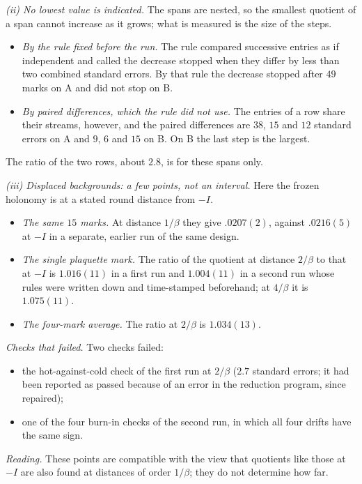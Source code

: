 \emph{{\upshape(ii)} No lowest value is indicated.} The spans are nested, so the smallest quotient of a span
cannot increase as it grows; what is measured is the size of the steps.
\begin{itemize}
\item \emph{By the rule fixed before the run.} The rule compared successive entries as if independent and
called the decrease stopped when they differ by less than two combined standard errors. By that rule the
decrease stopped after $49$ marks on \textsf{A} and did not stop on \textsf{B}.
\item \emph{By paired differences, which the rule did not use.} The entries of a row share their streams,
however, and the paired differences are $38$, $15$ and $12$ standard errors on \textsf{A} and $9$, $6$ and $15$ on \textsf{B}.
On \textsf{B} the last step is the largest.
\end{itemize}
The ratio of the two rows, about $2.8$, is for these spans only.

\emph{{\upshape(iii)} Displaced backgrounds: a few points, not an interval.} Here the frozen holonomy is at a
stated round distance from $-I$.
\begin{itemize}
\item \emph{The same $15$ marks.} At distance $1/\beta$ they give $.0207(2)$, against $.0216(5)$ at $-I$ in a
separate, earlier run of the same design.
\item \emph{The single plaquette mark.} The ratio of the quotient at distance $2/\beta$ to that at $-I$ is
$1.016(11)$ in a first run and $1.004(11)$ in a second run whose rules were written down and time-stamped beforehand; at
$4/\beta$ it is $1.075(11)$.
\item \emph{The four-mark average.} The ratio at $2/\beta$ is $1.034(13)$.
\end{itemize}

\emph{Checks that failed.} Two checks failed:
\begin{itemize}
\item the hot-against-cold check of the first run at $2/\beta$ ($2.7$ standard errors; it had been reported
as passed because of an error in the reduction program, since repaired);
\item one of the four burn-in checks of the second run, in which all four drifts have the same sign.
\end{itemize}

\emph{Reading.} These points are compatible with the view that quotients like those at $-I$ are also found at distances of order
$1/\beta$; they do not determine how far.

